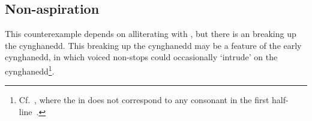 \subsection{Non-aspiration}
This counterexample depends on  alliterating with , but there is an  breaking up the cynghanedd. This  breaking up the cynghanedd may be a feature of the early cynghanedd, in which voiced non-stops could occasionally `intrude' on the cynghanedd\footnote{Cf.\ , where the  in  does not correspond to any consonant in the first half-line~\parencite[203--07]{jones_meddwl_2005}.}.

